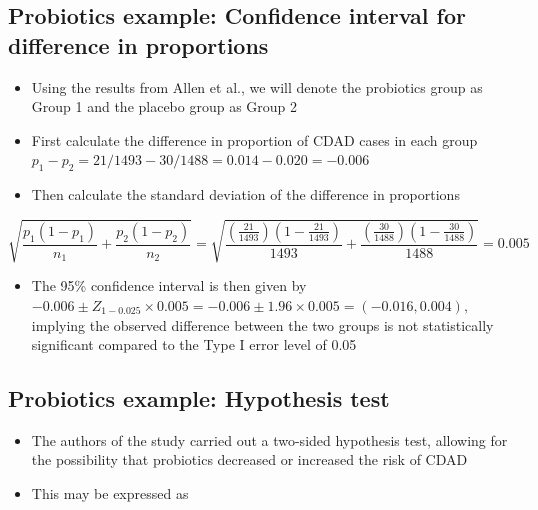 \documentclass[
]{book}
\providecommand{\tightlist}{%
  \setlength{\itemsep}{0pt}\setlength{\parskip}{0pt}}
\begin{document}
\hypertarget{probiotics-example-confidence-interval-for-difference-in-proportions}{%
\subsection{Probiotics example: Confidence interval for difference in proportions}\label{probiotics-example-confidence-interval-for-difference-in-proportions}}

\begin{itemize}
\tightlist
\item
  Using the results from Allen et al., we will denote the probiotics group as Group 1 and the placebo group as Group 2
\item
  First calculate the difference in proportion of CDAD cases in each group\\
  \(p_1 - p_2 = 21/1493 - 30/1488 = 0.014 - 0.020 = -0.006\)
\item
  Then calculate the standard deviation of the difference in proportions
\end{itemize}

\[\sqrt{\frac{p_1(1-p_1)}{n_1}+\frac{p_2(1-p_2)}{n_2}}=\sqrt{\frac{\left(\frac{21}{1493}\right)\left(1-\frac{21}{1493}\right)}{1493}+\frac{\left(\frac{30}{1488}\right)\left(1-\frac{30}{1488}\right)}{1488}}=0.005\]

\begin{itemize}
\tightlist
\item
  The 95\% confidence interval is then given by\\
  \(-0.006 ± Z_{1-0.025} × 0.005 = -0.006 ± 1.96 × 0.005 = (-0.016, 0.004),\)\\
  implying the observed difference between the two groups is not statistically significant compared to the Type I error level of 0.05
\end{itemize}

\hypertarget{probiotics-example-hypothesis-test}{%
\subsection{Probiotics example: Hypothesis test}\label{probiotics-example-hypothesis-test}}

\begin{itemize}
\tightlist
\item
  The authors of the study carried out a two-sided hypothesis test, allowing for the possibility that probiotics decreased or increased the risk of CDAD
\item
  This may be expressed as
\end{itemize}
\end{document}
